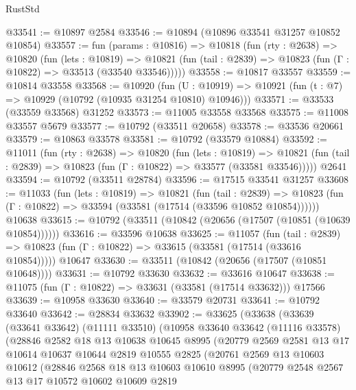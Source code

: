 \begin{lexlean}{RustStd}
\begin{coremodule}
@33541 := @10897 @2584
@33546 := @10894 (@10896 @33541 @31257 @10852 @10854)
@33557 := fun (params : @10816) =>
  @10818
    (fun (rty : @2638) =>
    @10820
      (fun (lets : @10819) =>
      @10821 (fun (tail : @2839) => @10823 (fun (Γ : @10822) => @33513 (@33540 @33546)))))
@33558 := @10817 @33557
@33559 := @10814 @33558
@33568 := @10920
    (fun (U : @10919) => @10921 (fun (t : @7) => @10929 (@10792 (@10935 @31254 @10810) @10946)))
@33571 := @33533 (@33559 @33568) @31252
@33573 := @11005 @33558 @33568
@33575 := @11008 @33557 @5679
@33577 := @10792 (@33511 @20658)
@33578 := @33536 @20661
@33579 := @10863 @33578
@33581 := @10792 (@33579 @10884)
@33592 := @11011
    (fun (rty : @2638) =>
    @10820
      (fun (lets : @10819) =>
      @10821 (fun (tail : @2839) => @10823 (fun (Γ : @10822) => @33577 (@33581 @33546)))))
    @2641
@33594 := @10792 (@33511 @28784)
@33596 := @17515 @33541 @31257
@33608 := @11033
    (fun (lets : @10819) =>
    @10821
      (fun (tail : @2839) =>
      @10823 (fun (Γ : @10822) => @33594 (@33581 (@17514 (@33596 @10852 @10854))))))
    @10638
@33615 := @10792 (@33511 (@10842 (@20656 (@17507 (@10851 (@10639 @10854))))))
@33616 := @33596 @10638
@33625 := @11057
    (fun (tail : @2839) => @10823 (fun (Γ : @10822) => @33615 (@33581 (@17514 (@33616 @10854)))))
    @10647
@33630 := @33511 (@10842 (@20656 (@17507 (@10851 @10648))))
@33631 := @10792 @33630
@33632 := @33616 @10647
@33638 := @11075 (fun (Γ : @10822) => @33631 (@33581 (@17514 @33632))) @17566
@33639 := @10958 @33630
@33640 := @33579 @20731
@33641 := @10792 @33640
@33642 := @28834 @33632
@33902 := @33625
    (@33638
      (@33639
        (@33641 @33642)
        (@11111 @33510)
        (@10958
          @33640
          @33642
          (@11116 @33578)
          (@28846
            @2582
            @18
            @13
            @10638
            @10645
            @8995
            (@20779
              @2569
              @2581
              @13
              @17
              @10614
              @10637
              @10644
              @2819
              @10555
              @2825
              (@20761
                @2569
                @13
                @10603
                @10612
                (@28846
                  @2568
                  @18
                  @13
                  @10603
                  @10610
                  @8995
                  (@20779
                    @2548
                    @2567
                    @13
                    @17
                    @10572
                    @10602
                    @10609
                    @2819

\end{coremodule}
\end{lexlean}
